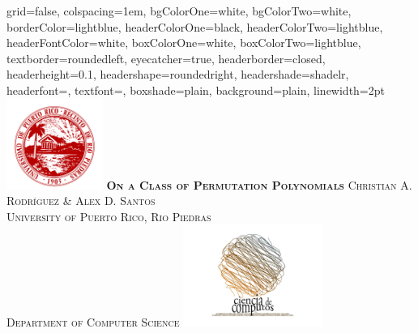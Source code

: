 \documentclass[landscape,final,paperwidth=48in,paperheight=38in]{baposter}
\begin{document}
\begin{poster}%
  {
  grid=false,
  colspacing=1em,
  bgColorOne=white,
  bgColorTwo=white,
  borderColor=lightblue,
  headerColorOne=black,
  headerColorTwo=lightblue,
  headerFontColor=white,
  boxColorOne=white,
  boxColorTwo=lightblue,
  textborder=roundedleft,
  eyecatcher=true,
  headerborder=closed,
  headerheight=0.1\textheight,
  headershape=roundedright,
  headershade=shadelr,
  headerfont=\huge\textsc, %
  textfont=\large{\setlength{\parindent}{1.5em}},
  boxshade=plain,
  background=plain,
  linewidth=2pt
  }
  {\includegraphics[height=8em,keepaspectratio=true]{images/logo_uprrp}} 
  {\bf\textsc{On a Class of Permutation Polynomials}\vspace{0.1em}}
  {\textsc{Christian A. Rodr\'{\i}guez \& Alex D. Santos \\ University of Puerto Rico, Rio Piedras \\ Department of Computer Science}}
  {%
    \includegraphics[height=9em,keepaspectratio=true]{images/logo_ccom}
  }

    \newcommand{\colouredcircle}{%
      \tikz{\useasboundingbox (-0.2em,-0.32em) rectangle(0.2em,0.32em); \draw[draw=black,fill=lightblue,line width=0.03em] (0,0) circle(0.18em);}}


\end{poster}
\end{document}
